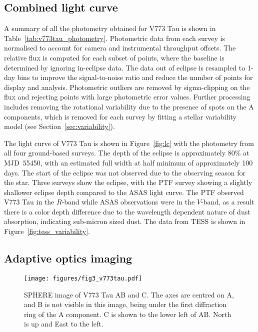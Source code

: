 \documentclass{aa}
\begin{document}
\subsection{Combined light curve}

A summary of all the photometry obtained for V773 Tau is shown in Table~\ref{tab:v773tau_photometry}.
%
Photometric data from each survey is normalised to account for camera and instrumental throughput offsets.
%
The relative flux is computed for each subset of points, where the baseline is determined by ignoring in-eclipse data.
%
The data out of eclipse is resampled to 1-day bins to improve the signal-to-noise ratio and reduce the number of points for display and analysis.
%
Photometric outliers are removed by sigma-clipping on the flux and rejecting points with large photometric error values.
%
Further processing includes removing the rotational variability due to the presence of spots on the A components, which is removed for each survey by fitting a stellar variability model (see Section~\ref{sec:variability}). 

The light curve of V773 Tau is shown in Figure~\ref{fig:lc} with the photometry from all four ground-based surveys.
%
The depth of the eclipse is approximately 80\% at MJD~55450, with an estimated full width at half minimum of approximately 100 days. 
%
The start of the eclipse was not observed due to the observing season for the star.
%
Three surveys show the eclipse, with the PTF survey showing a slightly shallower eclipse depth compared to the ASAS light curve.
%
The PTF observed V773 Tau in the $R$-band while ASAS observations were in the $V$-band, as a result there is a color depth difference due to the wavelength dependent nature of dust absorption, indicating sub-micron sized dust.
%
The data from TESS is shown in Figure~\ref{fig:tess_variability}.

\subsection{Adaptive optics imaging}\label{sec:di}

\begin{figure}[ht]
    \centering
    \texttt{[image: figures/fig3\_v773tau.pdf]}
    \caption{SPHERE image of V773 Tau AB and C. The axes are centred on A, and B is not visible in this image, being under the first diffraction ring of the A component.
    C is shown to the lower left of AB.
    North is up and East to the left.}
  \label{fig:sphere}
\end{figure}
\end{document}
